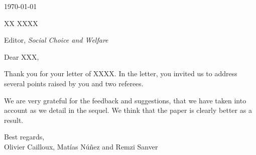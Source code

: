 \documentclass[12pt]{letter}
\begin{document}
\today

XX XXXX

Editor, \emph{Social Choice and Welfare}

Dear XXX, 

Thank you for your letter of XXXX. In the letter, you invited us to address several points raised by you and two referees.

We are very grateful for the feedback and suggestions, that we have taken into account as we detail in the sequel. We think that the paper is clearly better as a result. 


\medskip

Best regards,\\

Olivier Cailloux,
 Mat\'ias N\'u\~nez
 and Remzi Sanver

\clearpage
\end{document}
